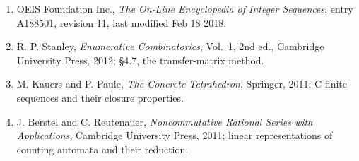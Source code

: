 \documentclass[11pt]{article}
\theoremstyle{definition}
\begin{document}
\begin{enumerate}

\item OEIS Foundation Inc., \emph{The On-Line Encyclopedia of Integer Sequences}, entry \href{https://oeis.org/A188501}{A188501}, revision 11, last modified Feb 18 2018.

\item R. P. Stanley, \emph{Enumerative Combinatorics}, Vol.~1, 2nd ed., Cambridge University Press, 2012; \S4.7, the transfer-matrix method.

\item M. Kauers and P. Paule, \emph{The Concrete Tetrahedron}, Springer, 2011; C-finite sequences and their closure properties.

\item J. Berstel and C. Reutenauer, \emph{Noncommutative Rational Series with Applications}, Cambridge University Press, 2011; linear representations of counting automata and their reduction.

\end{enumerate}
\end{document}
